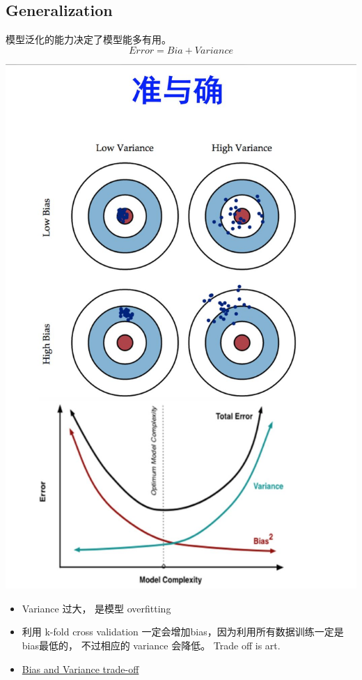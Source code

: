 \documentclass[12pt]{article}
\numberwithin{theorem}{section} %
\numberwithin{definition}{section} %
\numberwithin{assumption}{section} %
\numberwithin{lemma}{section} %
\numberwithin{remark}{section} %
\numberwithin{prop}{section} %
\numberwithin{corollary}{section} %
\numberwithin{example}{section} %
\numberwithin{question}{section} %
\numberwithin{problem}{section} %
\numberwithin{conjecture}{section} %
\numberwithin{append}{section} %
\numberwithin{property}{section} %
\begin{document}
\begin{CJK}{UTF8}{gbsn}
\section{Generalization}

模型泛化的能力决定了模型能多有用。
$$Error = Bia + Variance$$

\begin{center}
	\includegraphics[scale=0.35]{pics/bias_var.jpg}
\end{center}

\begin{itemize}
	\item Variance 过大， 是模型 overfitting 
	\item 利用 k-fold  cross validation 一定会增加bias，因为利用所有数据训练一定是 bias最低的， 不过相应的 variance 会降低。 Trade off is art.
	\item \href{http://scott.fortmann-roe.com/docs/BiasVariance.html}{Bias and Variance trade-off}
\end{itemize}
	

\end{CJK}
\end{document}
